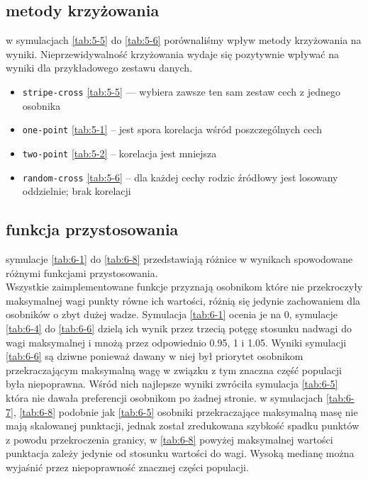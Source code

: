 \documentclass{article}
\newcommand{\cljt}[1]{\texttt{#1}}
\newcommand{\inputgraph}[1]{\newpage \newpage} %
\begin{document}
\subsection{metody krzyżowania}
w symulacjach \ref{tab:5-5} do \ref{tab:5-6} porównaliśmy wpływ metody
krzyżowania na wyniki. Nieprzewidywalność krzyżowania wydaje się pozytywnie
wpływać na wyniki dla przykładowego zestawu danych.
\begin{itemize}
	\item \cljt{stripe-cross} \ref{tab:5-5} --- wybiera zawsze ten sam zestaw cech z jednego osobnika
	\item \cljt{one-point} \ref{tab:5-1} -- jest spora korelacja wśród poszczególnych cech
	\item \cljt{two-point} \ref{tab:5-2} -- korelacja jest mniejsza
	\item \cljt{random-cross} \ref{tab:5-6} -- dla każdej cechy rodzic źródłowy jest losowany
	      oddzielnie; brak korelacji
\end{itemize}

\inputgraph{5-5.transient.tex}
\inputgraph{5-1.transient.tex}
\inputgraph{5-2.transient.tex}
\inputgraph{5-6.transient.tex}
\subsection{funkcja przystosowania}
symulacje \ref{tab:6-1} do \ref{tab:6-8} przedstawiają różnice w wynikach
spowodowane różnymi funkcjami przystosowania. \\
Wszystkie zaimplementowane funkcje przyznają osobnikom które nie przekroczyły maksymalnej wagi
punkty równe ich wartości, różnią się jedynie zachowaniem dla osobników o zbyt
dużej wadze.
Symulacja \ref{tab:6-1} ocenia je na 0, symulacje \ref{tab:6-4} do \ref{tab:6-6} dzielą ich wynik przez trzecią potęgę stosunku
nadwagi do wagi maksymalnej i mnożą przez odpowiednio 0.95, 1 i 1.05.
Wyniki symulacji \ref{tab:6-6} są dziwne ponieważ dawany w niej był priorytet
osobnikom przekraczającym maksymalną wagę w związku z tym znaczna część
populacji była niepoprawna. Wśród nich najlepsze wyniki
zwróciła symulacja \ref{tab:6-5} która nie dawała preferencji osobnikom po
żadnej stronie. w symulacjach \ref{tab:6-7}, \ref{tab:6-8} podobnie jak
\ref{tab:6-5} osobniki przekraczające maksymalną masę nie mają skalowanej
punktacji, jednak został zredukowana szybkość spadku punktów z powodu przekroczenia
granicy, w \ref{tab:6-8} powyżej maksymalnej wartości punktacja zależy jedynie
od stosunku wartości do wagi. Wysoką medianę można wyjaśnić przez niepoprawność
znacznej części populacji.
\inputgraph{6-1.transient.tex}
\inputgraph{6-4.transient.tex}
\inputgraph{6-5.transient.tex}
\inputgraph{6-6.transient.tex}
\inputgraph{6-7.transient.tex}
\inputgraph{6-8.transient.tex}
\end{document}
